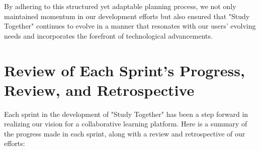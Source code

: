 By adhering to this structured yet adaptable planning process, we not only maintained momentum in our development efforts but also ensured that "Study Together" continues to evolve in a manner that resonates with our users' evolving needs and incorporates the forefront of technological advancements.

\section{Review of Each Sprint's Progress, Review, and Retrospective}

Each sprint in the development of "Study Together" has been a step forward in realizing our vision for a collaborative learning platform. Here is a summary of the progress made in each sprint, along with a review and retrospective of our efforts:




